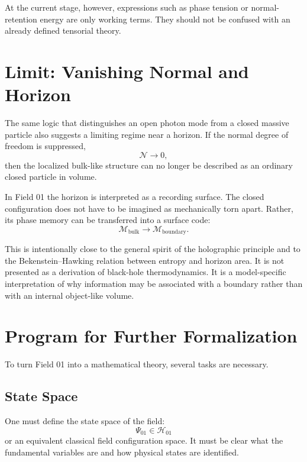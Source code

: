 \documentclass[11pt,a4paper]{article}
\newcommand{\normal}{\mathcal{N}}
\newcommand{\memory}{\mathcal{M}}
\begin{document}
At the current stage, however, expressions such as phase tension or normal-retention energy are only working terms. They should not be confused with an already defined tensorial theory.

\section{Limit: Vanishing Normal and Horizon}

The same logic that distinguishes an open photon mode from a closed massive particle also suggests a limiting regime near a horizon. If the normal degree of freedom is suppressed,
\begin{equation}
\normal \rightarrow 0,
\end{equation}
then the localized bulk-like structure can no longer be described as an ordinary closed particle in volume.

In Field 01 the horizon is interpreted as a recording surface. The closed configuration does not have to be imagined as mechanically torn apart. Rather, its phase memory can be transferred into a surface code:
\begin{equation}
\memory_{\mathrm{bulk}} \longrightarrow \memory_{\mathrm{boundary}}.
\end{equation}

This is intentionally close to the general spirit of the holographic principle and to the Bekenstein--Hawking relation between entropy and horizon area. It is not presented as a derivation of black-hole thermodynamics. It is a model-specific interpretation of why information may be associated with a boundary rather than with an internal object-like volume.

\section{Program for Further Formalization}

To turn Field 01 into a mathematical theory, several tasks are necessary.

\subsection*{State Space}

One must define the state space of the field:
\begin{equation}
\Psi_{01} \in \mathcal{H}_{01}
\end{equation}
or an equivalent classical field configuration space. It must be clear what the fundamental variables are and how physical states are identified.
\end{document}
